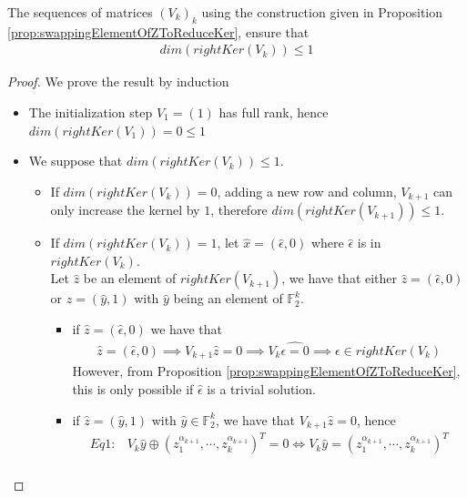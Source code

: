 \documentclass[11pt]{llncs}
\begin{document}
\begin{proposition}\label{prop:upperBoundOnRightKernel}
    The sequences of matrices $(V_k)_k$ using the construction given in Proposition \ref{prop:swappingElementOfZToReduceKer}, ensure that
    \begin{align*}
        dim\left(rightKer\left(V_k\right)\right) \leq 1
    \end{align*}
\end{proposition}
\begin{proof}
    We prove the result by induction
    \begin{itemize}
        \item The initialization step $V_1 = (1)$ has full rank, hence $dim(rightKer(V_1)) = 0 \leq 1$
        \item We suppose that $dim(rightKer(V_k)) \leq 1$. 
        \begin{itemize}
            \item If $dim(rightKer(V_k)) = 0$, adding a new row and column, $V_{k+1}$ can only increase the kernel by $1$, therefore $dim\left(rightKer(V_{k+1})\right) \leq 1$.
            \item If $dim(rightKer(V_k)) = 1$, let $\hat{x} = \left(\hat{\epsilon}, 0 \right)$ where $\hat{\epsilon}$ is in $rightKer(V_k)$.\\
            Let $\hat{z}$ be an element of $rightKer\left(V_{k+1}\right)$, we have that either $\hat{z} = (\hat{\epsilon}, 0)$ or $z = (\hat{y}, 1)$ with $\hat{y}$ being an element of $\mathbb{F}_2^{k}$.\\
            \begin{itemize}
                \item if $\hat{z} = (\hat{\epsilon}, 0)$ we have that
                \begin{align*}
                     \hat{z} = (\hat{\epsilon}, 0) \implies V_{k+1} \hat{z} = 0 \implies V_{k} \hat{\epsilon = 0} \implies \epsilon \in rightKer(V_k)
                \end{align*}
                However, from Proposition \ref{prop:swappingElementOfZToReduceKer}, this is only possible if $\hat{\epsilon}$ is a trivial solution.
                \item if $\hat{z} = (\hat{y}, 1)$ with $\hat{y} \in \mathbb{F}_2^k$, we have that $V_{k+1} \hat{z} = 0$, hence
                \begin{align*}
                        Eq1: & V_{k} \hat{y} \oplus (z_{1}^{\alpha_{k+1}}, \cdots, z_{k}^{\alpha_{k+1}})^T = 0 \iff V_{k} \hat{y} = (z_{1}^{\alpha_{k+1}}, \cdots, z_{k}^{\alpha_{k+1}})^T\\

\end{align*}
\end{itemize}
\end{itemize}
\end{itemize}
\end{proof}
\end{document}
